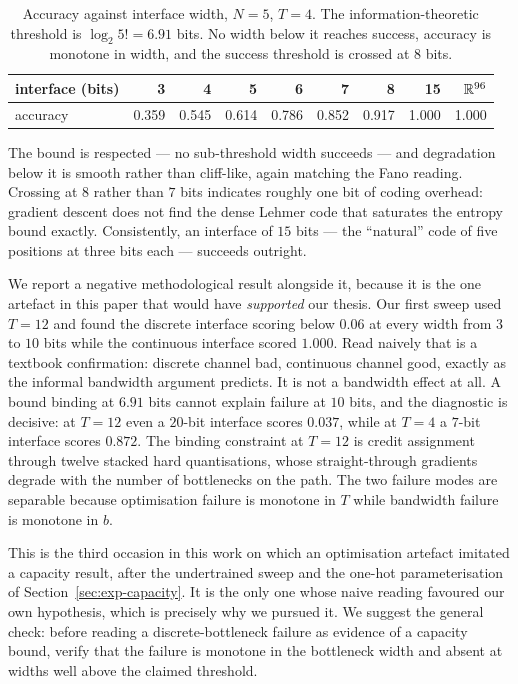 \begin{table}[h]
\centering
\begin{tabular}{lrrrrrrrr}
\toprule
interface (bits) & 3 & 4 & 5 & 6 & 7 & 8 & 15 & $\mathbb{R}^{96}$ \\
\midrule
accuracy & 0.359 & 0.545 & 0.614 & 0.786 & 0.852 & 0.917 & 1.000 & 1.000 \\
\bottomrule
\end{tabular}
\caption{Accuracy against interface width, $N=5$, $T=4$. The information-theoretic
threshold is $\log_2 5! = 6.91$ bits. No width below it reaches success, accuracy
is monotone in width, and the success threshold is crossed at $8$ bits.}
\label{tab:bandwidth}
\end{table}

The bound is respected --- no sub-threshold width succeeds --- and degradation
below it is smooth rather than cliff-like, again matching the Fano reading.
Crossing at $8$ rather than $7$ bits indicates roughly one bit of coding
overhead: gradient descent does not find the dense Lehmer code that saturates the
entropy bound exactly. Consistently, an interface of $15$ bits --- the ``natural''
code of five positions at three bits each --- succeeds outright.

We report a negative methodological result alongside it, because it is the one
artefact in this paper that would have \emph{supported} our thesis. Our first
sweep used $T=12$ and found the discrete interface scoring below $0.06$ at every
width from $3$ to $10$ bits while the continuous interface scored $1.000$.
Read naively that is a textbook confirmation: discrete channel bad, continuous
channel good, exactly as the informal bandwidth argument predicts. It is not a
bandwidth effect at all. A bound binding at $6.91$ bits cannot explain failure at
$10$ bits, and the diagnostic is decisive: at $T=12$ even a $20$-bit interface
scores $0.037$, while at $T=4$ a $7$-bit interface scores $0.872$. The binding
constraint at $T=12$ is credit assignment through twelve stacked hard
quantisations, whose straight-through gradients degrade with the number of
bottlenecks on the path. The two failure modes are separable because
optimisation failure is monotone in $T$ while bandwidth failure is monotone in
$b$.

This is the third occasion in this work on which an optimisation artefact
imitated a capacity result, after the undertrained sweep and the one-hot
parameterisation of Section~\ref{sec:exp-capacity}. It is the only one whose
naive reading favoured our own hypothesis, which is precisely why we pursued it.
We suggest the general check: before reading a discrete-bottleneck failure as
evidence of a capacity bound, verify that the failure is monotone in the
bottleneck width and absent at widths well above the claimed threshold.


